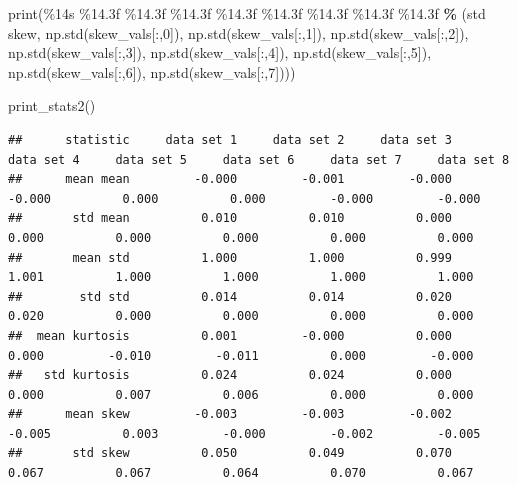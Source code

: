 \documentclass[
]{book}
\newenvironment{Shaded}{\begin{snugshade}}{\end{snugshade}}
\newcommand{\BuiltInTok}[1]{#1}
\newcommand{\DecValTok}[1]{\textcolor[rgb]{0.00,0.00,0.81}{#1}}
\newcommand{\NormalTok}[1]{#1}
\newcommand{\OperatorTok}[1]{\textcolor[rgb]{0.81,0.36,0.00}{\textbf{#1}}}
\newcommand{\SpecialCharTok}[1]{\textcolor[rgb]{0.00,0.00,0.00}{#1}}
\newcommand{\StringTok}[1]{\textcolor[rgb]{0.31,0.60,0.02}{#1}}
\begin{document}
\begin{Shaded}
\begin{Highlighting}[]
  \BuiltInTok{print}\NormalTok{(}\StringTok{\textquotesingle{}}\SpecialCharTok{\%14s}\StringTok{ }\SpecialCharTok{\%14.3f}\StringTok{ }\SpecialCharTok{\%14.3f}\StringTok{ }\SpecialCharTok{\%14.3f}\StringTok{ }\SpecialCharTok{\%14.3f}\StringTok{ }\SpecialCharTok{\%14.3f}\StringTok{ }\SpecialCharTok{\%14.3f}\StringTok{ }\SpecialCharTok{\%14.3f}\StringTok{ }\SpecialCharTok{\%14.3f}\StringTok{\textquotesingle{}} \OperatorTok{\%}\NormalTok{ (}\StringTok{\textquotesingle{}std skew\textquotesingle{}}\NormalTok{, np.std(skew\_vals[:,}\DecValTok{0}\NormalTok{]), np.std(skew\_vals[:,}\DecValTok{1}\NormalTok{]), np.std(skew\_vals[:,}\DecValTok{2}\NormalTok{]), np.std(skew\_vals[:,}\DecValTok{3}\NormalTok{]), np.std(skew\_vals[:,}\DecValTok{4}\NormalTok{]), np.std(skew\_vals[:,}\DecValTok{5}\NormalTok{]), np.std(skew\_vals[:,}\DecValTok{6}\NormalTok{]), np.std(skew\_vals[:,}\DecValTok{7}\NormalTok{])))}
  
\NormalTok{print\_stats2()  }
\end{Highlighting}
\end{Shaded}

\begin{verbatim}
##      statistic     data set 1     data set 2     data set 3     data set 4     data set 5     data set 6     data set 7     data set 8
##      mean mean         -0.000         -0.001         -0.000         -0.000          0.000          0.000         -0.000         -0.000
##       std mean          0.010          0.010          0.000          0.000          0.000          0.000          0.000          0.000
##       mean std          1.000          1.000          0.999          1.001          1.000          1.000          1.000          1.000
##        std std          0.014          0.014          0.020          0.020          0.000          0.000          0.000          0.000
##  mean kurtosis          0.001         -0.000          0.000          0.000         -0.010         -0.011          0.000         -0.000
##   std kurtosis          0.024          0.024          0.000          0.000          0.007          0.006          0.000          0.000
##      mean skew         -0.003         -0.003         -0.002         -0.005          0.003         -0.000         -0.002         -0.005
##       std skew          0.050          0.049          0.070          0.067          0.067          0.064          0.070          0.067
\end{verbatim}

  
\end{document}
